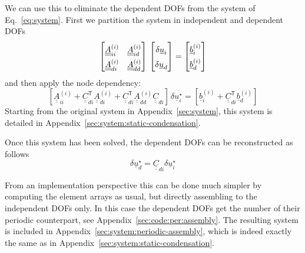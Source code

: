 \documentclass[times,namecite]{goose-article}
\begin{document}
We can use this to eliminate the dependent DOFs from the system of Eq.~\ref{eq:system}. First we partition the system in independent and dependent DOFs
\begin{equation}
  \begingroup
  \renewcommand*{\arraystretch}{1.5}
  \begin{bmatrix}
  \underline{\underline{A}}^{(i)}_{ii} & \underline{\underline{A}}^{(i)}_{id} \\
  \underline{\underline{A}}^{(i)}_{di} & \underline{\underline{A}}^{(i)}_{dd}
  \end{bmatrix}
  \,
  \begin{bmatrix}
  \delta \underline{u}_{i} \\
  \delta \underline{u}_{d}
  \end{bmatrix}
  =
  \begin{bmatrix}
  \underline{b}^{(i)}_{i} \\
  \underline{b}^{(i)}_{d}
  \end{bmatrix}
  \endgroup
\end{equation}
and then apply the node dependency:
\begin{equation}
  \left[
  \underline{\underline{A}}^{(i)}_{ii}
  +
  \underline{\underline{C}}_{di}^\mathsf{T}
  \underline{\underline{A}}^{(i)}_{di}
  +
  \underline{\underline{C}}_{di}^\mathsf{T}
  \underline{\underline{A}}^{(i)}_{dd}
  \underline{\underline{C}}_{di}
  \right]
  \,
  \delta \underline{u}^\star_{i}
  =
  \left[
  \underline{b}^{(i)}_{i}
  +
  \underline{\underline{C}}_{di}^\mathsf{T}
  \underline{b}^{(i)}_{d}
  \right]
\end{equation}
Starting from the original system in Appendix~\ref{sec:system}, this system is detailed in Appendix~\ref{sec:system:static-condensation}.

Once this system has been solved, the dependent DOFs can be reconstructed as follows
\begin{equation}
  \delta \underline{u}^\star_{d}
  =
  \underline{\underline{C}}_{di}
  \delta \underline{u}^\star_{i}
\end{equation}

From an implementation perspective this can be done much simpler by computing the element arrays as usual, but directly assembling to the independent DOFs only. In this case the dependent DOFs get the number of their periodic counterpart, see Appendix~\ref{sec:code:per:assembly}. The resulting system is included in Appendix~\ref{sec:system:periodic-assembly}, which is indeed exactly the same as in Appendix~\ref{sec:system:static-condensation}.
\end{document}

